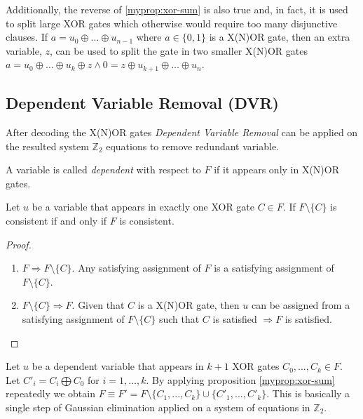 Additionally, the reverse of \ref{myprop:xor-sum} is also true and,
in fact, it is used to split large XOR gates which otherwise would
require too many disjunctive clauses. If $a = u_0 \oplus \ldots
\oplus u_{n-1}$ where $a \in \{0, 1\}$ is a X(N)OR gate, then an
extra variable, $z$, can be used to split the gate in two smaller
X(N)OR gates $a = u_0 \oplus \ldots \oplus u_{k} \oplus z \land 0 =
z \oplus u_{k + 1} \oplus \ldots \oplus u_{n}$.


\subsection{Dependent Variable Removal (DVR)}
\label{ssec:dvr}

After decoding the X(N)OR gates \emph{Dependent Variable
Removal} \cite{mine:march} can be applied on the resulted system
$\mathbb{Z}_2$ equations to remove redundant variable.

\begin{mydef}
  A variable is called \emph{dependent} with respect to $F$ if it
  appears only in X(N)OR gates.
\end{mydef}

\begin{myprop}[DVR]
  \label{myprop:dvr-single}
  Let $u$ be a variable that appears in exactly one XOR gate $C
  \in F$. If $F \setminus \{C\}$ is consistent if and only if $F$
  is consistent.
\end{myprop}

\begin{proof}
  \begin{enumerate}
    \item $F \Rightarrow F \setminus \{C\}$. Any satisfying
    assignment of $F$ is a satisfying assignment of $F \setminus
    \{C\}$. 
    \item $F \setminus \{C\} \Rightarrow F$.  Given that $C$ is a X(N)OR
    gate, then $u$ can be assigned from a satisfying assignment of
    $F \setminus \{C\}$ such that $C$ is satisfied $\Rightarrow F$
    is satisfied.
  \end{enumerate}
\end{proof}


Let $u$ be a dependent variable that appears in $k + 1$ XOR gates
$C_0, ..., C_k \in F$. Let $C'_i = C_i \bigoplus C_0$ for $i = 1,
\ldots, k$.  By applying proposition \ref{myprop:xor-sum} repeatedly we
obtain $F \equiv F' = F \setminus \{C_{1}, ..., C_k\} \cup \{C'_{1},
..., C'_k\}$. This is basically a single step of Gaussian
elimination applied on a system of equations in $\mathbb{Z}_2$.

